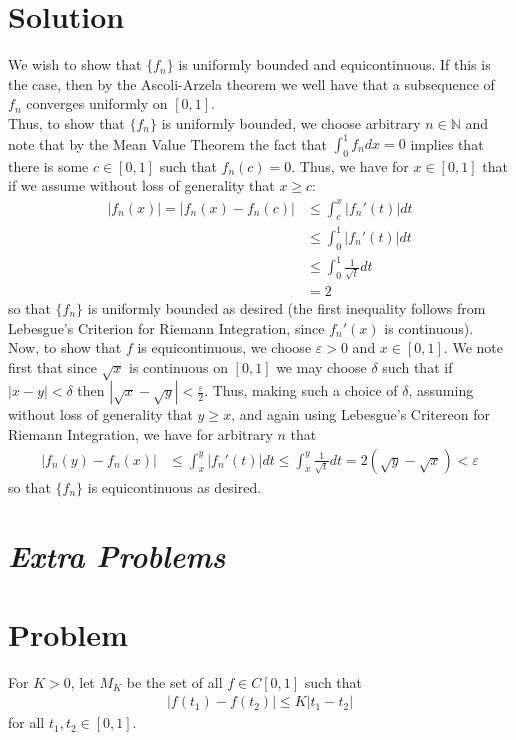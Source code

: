 \documentclass{article}
\begin{document}
\section*{Solution}
We wish to show that $\{f_n\}$ is uniformly bounded and equicontinuous.  If this is the case, then by the Ascoli-Arzela theorem we well have that a subsequence of $f_n$ converges uniformly on $[0,1]$.\\

\noindent Thus, to show that $\{f_n\}$ is uniformly bounded, we choose arbitrary $n\in\mathbb{N}$ and note that by the Mean Value Theorem the fact that $\int_0^1f_ndx=0$ implies that there is some $c\in[0,1]$ such that $f_n(c)=0$.  Thus, we have for $x\in[0,1]$ that if we assume without loss of generality that $x\geq c$:
\begin{align*}
|f_n(x)|=|f_n(x)-f_n(c)|&\leq\int_c^x|f_n'(t)|dt\\
&\leq\int_0^1|f_n'(t)|dt\\
&\leq\int_0^1\frac{1}{\sqrt{t}}dt\\
&=2
\end{align*}
so that $\{f_n\}$ is uniformly bounded as desired (the first inequality follows from Lebesgue's Criterion for Riemann Integration, since $f_n'(x)$ is continuous).\\

\noindent Now, to show that $f$ is equicontinuous, we choose $\varepsilon>0$ and $x\in[0,1]$.  We note first that since $\sqrt{x}$ is continuous on $[0,1]$ we may choose $\delta$ such that if $|x-y|<\delta$ then $|\sqrt{x}-\sqrt{y}|<\frac{\varepsilon}{2}$.  Thus, making such a choice of $\delta$, assuming without loss of generality that $y\geq x$, and again using Lebesgue's Critereon for Riemann Integration, we have for arbitrary $n$ that
\begin{align*}
|f_n(y)-f_n(x)|&\leq\int_x^y|f_n'(t)|dt\leq\int_x^y\frac{1}{\sqrt{t}}dt=2(\sqrt{y}-\sqrt{x})<\varepsilon
\end{align*}
so that $\{f_n\}$ is equicontinuous as desired.


\section*{{\it Extra Problems}}

\section*{Problem}
For $K>0$, let $M_K$ be the set of all $f\in C[0,1]$ such that
\begin{align*}
|f(t_1)-f(t_2)|\leq K|t_1-t_2|
\end{align*}
for all $t_1,t_2\in[0,1]$.\\
\end{document}
